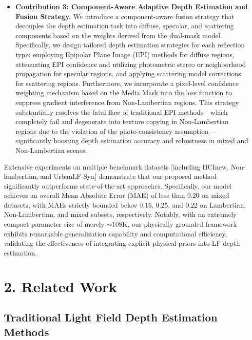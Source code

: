 \documentclass[lettersize,journal]{IEEEtran}
\begin{document}
\begin{itemize}\item \textbf{Contribution 3: Component-Aware Adaptive Depth Estimation and Fusion Strategy.} We introduce a component-aware fusion strategy that decouples the depth estimation task into diffuse, specular, and scattering components based on the weights derived from the dual-mask model. Specifically, we design tailored depth estimation strategies for each reflection type: employing Epipolar Plane Image (EPI) methods for diffuse regions, attenuating EPI confidence and utilizing photometric stereo or neighborhood propagation for specular regions, and applying scattering model corrections for scattering regions. Furthermore, we incorporate a pixel-level confidence weighting mechanism based on the Media Mask into the loss function to suppress gradient interference from Non-Lambertian regions. This strategy substantially resolves the fatal flaw of traditional EPI methods—which completely fail and degenerate into texture copying in Non-Lambertian regions due to the violation of the photo-consistency assumption—significantly boosting depth estimation accuracy and robustness in mixed and Non-Lambertian scenes.\end{itemize}

Extensive experiments on multiple benchmark datasets  [including HCInew, Non-lambertian, and UrbanLF-Syn] demonstrate that our proposed method significantly outperforms state-of-the-art approaches. Specifically, our model achieves an overall Mean Absolute Error (MAE) of less than $0.20$ on mixed datasets, with MAEs strictly bounded below $0.16$, $0.25$, and $0.22$ on Lambertian, Non-Lambertian, and mixed subsets, respectively. Notably, with an extremely compact parameter size of merely $\sim 108$K, our physically grounded framework exhibits remarkable generalization capability and computational efficiency, validating the effectiveness of integrating explicit physical priors into LF depth estimation.


\section{2. Related Work}

\subsection{Traditional Light Field Depth Estimation Methods}
\end{document}
